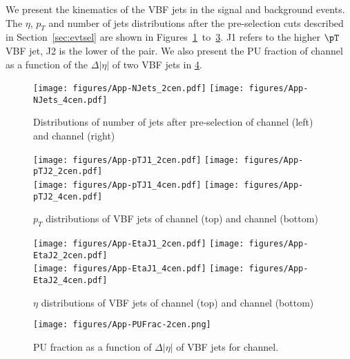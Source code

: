 We present the kinematics of the VBF jets in the signal and background events. The $\eta$, $p_{T}$ and number of jets distributions after the pre-selection cuts described in Section~\ref{sec:evtsel} are shown in Figures~\ref{fig:NJets}~to~\ref{fig:VBFeta}.  J1 refers to the higher $\pT$ VBF jet, J2 is the lower \pT of the pair. We also present the PU fraction of \twocentral channel as a function of the $\Delta|\eta|$ of two VBF jets in \ref{fig:PUdelta}.


\begin{figure}[htbp]
  \centering
 \texttt{[image: figures/App-NJets\_2cen.pdf]}
 \texttt{[image: figures/App-NJets\_4cen.pdf]}

\caption{Distributions of number of jets after pre-selection of \twocentral channel (left) and  \fourcentral channel (right)}
  \label{fig:NJets}
\end{figure}


\begin{figure}[htbp]
  \centering
 \texttt{[image: figures/App-pTJ1\_2cen.pdf]}
 \texttt{[image: figures/App-pTJ2\_2cen.pdf]}\\
 \texttt{[image: figures/App-pTJ1\_4cen.pdf]}
 \texttt{[image: figures/App-pTJ2\_4cen.pdf]}\\

\caption{$p_{T}$ distributions of VBF jets of \twocentral channel (top) and  \fourcentral channel (bottom)}
  \label{fig:VBFpT}
\end{figure}


\begin{figure}[htbp]
  \centering
 \texttt{[image: figures/App-EtaJ1\_2cen.pdf]}
 \texttt{[image: figures/App-EtaJ2\_2cen.pdf]}\\
 \texttt{[image: figures/App-EtaJ1\_4cen.pdf]}
 \texttt{[image: figures/App-EtaJ2\_4cen.pdf]}\\

\caption{$\eta$ distributions of VBF jets of \twocentral channel (top) and  \fourcentral channel (bottom)}
  \label{fig:VBFeta}
\end{figure}

\begin{figure}[htbp]
  \centering
 \texttt{[image: figures/App-PUFrac-2cen.png]}
\caption{PU fraction as a function of $\Delta|\eta|$ of VBF jets for \twocentral channel.}
  \label{fig:PUdelta}
\end{figure}
